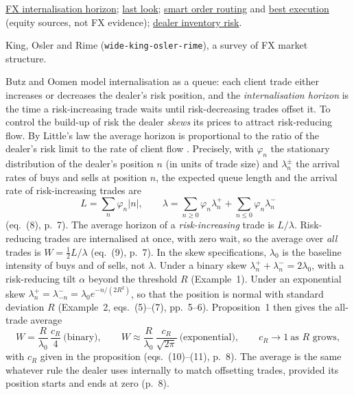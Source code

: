 \begin{qfdefinition}
 \hyperref[mod:fx-internalisation-horizon]{FX internalisation horizon}; \hyperref[mech:fx-last-look]{last look}; \hyperref[def:smart-order-routing]{smart order routing} and \hyperref[def:best-execution]{best execution} (equity sources, not FX evidence); \hyperref[def:dealer-inventory-risk]{dealer inventory risk}.

 King, Osler and Rime (\nolinkurl{wide-king-osler-rime}), a survey of FX market structure.

\end{qfdefinition}

\begin{qfmodel}\label{mod:fx-internalisation-horizon}
 Butz and Oomen model internalisation as a queue: each client trade either increases or decreases the dealer's risk position, and the \emph{internalisation horizon} is the time a risk-increasing trade waits until risk-decreasing trades offset it. To control the build-up of risk the dealer \emph{skews} its prices to attract risk-reducing flow. By Little's law the average horizon is proportional to the ratio of the dealer's risk limit to the rate of client flow \citep[accepted version, sec.~1, p.~2]{cfd-butz-oomen-2019}. Precisely, with $\varphi_n$ the stationary distribution of the dealer's position $n$ (in units of trade size) and $\lambda_n^\pm$ the arrival rates of buys and sells at position $n$, the expected queue length and the arrival rate of risk-increasing trades are
\[ L=\sum_n\varphi_n|n|,\qquad \lambda=\sum_{n\ge0}\varphi_n\lambda_n^++\sum_{n\le0}\varphi_n\lambda_n^- \]
(eq.~(8), p.~7). The average horizon of a \emph{risk-increasing} trade is $L/\lambda$. Risk-reducing trades are internalised at once, with zero wait, so the average over \emph{all} trades is $W=\tfrac12 L/\lambda$ (eq.~(9), p.~7). In the skew specifications, $\lambda_0$ is the baseline intensity of buys and of sells, not $\lambda$. Under a binary skew $\lambda_n^++\lambda_n^-=2\lambda_0$, with a risk-reducing tilt $\alpha$ beyond the threshold $R$ (Example~1). Under an exponential skew $\lambda_n^+=\lambda_{-n}^-=\lambda_0e^{-n/(2R^2)}$, so that the position is normal with standard deviation $R$ (Example~2, eqs.~(5)--(7), pp.~5--6). Proposition~1 then gives the all-trade average
\[ W=\frac{R}{\lambda_0}\,\frac{c_R}{4}\ \text{(binary)},\qquad W\approx\frac{R}{\lambda_0}\,\frac{c_R}{\sqrt{2\pi}}\ \text{(exponential)},\qquad c_R\to1\ \text{as $R$ grows}, \]
with $c_R$ given in the proposition (eqs.~(10)--(11), p.~8). The average is the same whatever rule the dealer uses internally to match offsetting trades, provided its position starts and ends at zero (p.~8).


\end{qfmodel}
